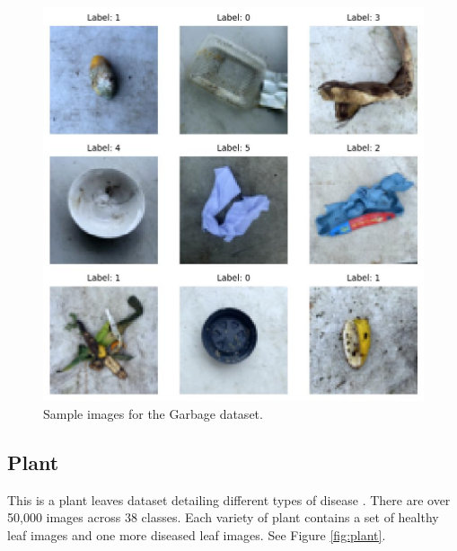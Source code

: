 \documentclass[letterpaper]{article} %
\theoremstyle{plain}
\theoremstyle{definition}
\theoremstyle{remark}
\begin{document}
\begin{figure}[htbp]
    \centering
    \includegraphics[width=\columnwidth]{../../images/garbage_1_sample.jpg}
    \caption{Sample images for the Garbage dataset.}
    \label{fig:garbage}
\end{figure}

\subsection{Plant} This is a plant leaves dataset detailing different types of disease \citep{plant}. There are over 50,000 images across 38 classes. Each variety of plant contains a set of healthy leaf images and one more diseased leaf images. See Figure \ref{fig:plant}.
\end{document}
